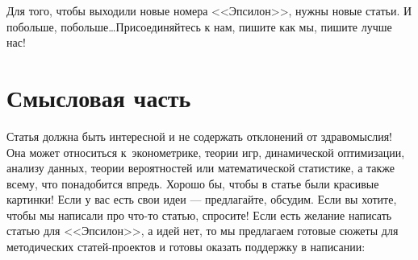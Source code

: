 \documentclass[11pt]{article}
\begin{document}


\DoFirstPageTechnicalStuff


Для того, чтобы выходили новые номера <<Эпсилон>>, нужны новые статьи. И побольше, побольше\ldots Присоединяйтесь к нам, пишите как мы, пишите лучше нас!


\section{Смысловая часть}

Статья должна быть интересной и не содержать отклонений от здравомыслия! Она может относиться к~эконометрике, теории игр, динамической оптимизации, анализу данных, теории вероятностей или математической статистике, а также всему, что понадобится впредь. Хорошо бы, чтобы в статье были красивые картинки! Если у вас есть свои идеи --- предлагайте, обсудим. Если вы хотите, чтобы мы написали про что-то статью, спросите! Если есть желание написать статью для <<Эпсилон>>, а идей нет, то мы предлагаем готовые сюжеты для методических статей-проектов и готовы оказать поддержку в написании:
\end{document}
